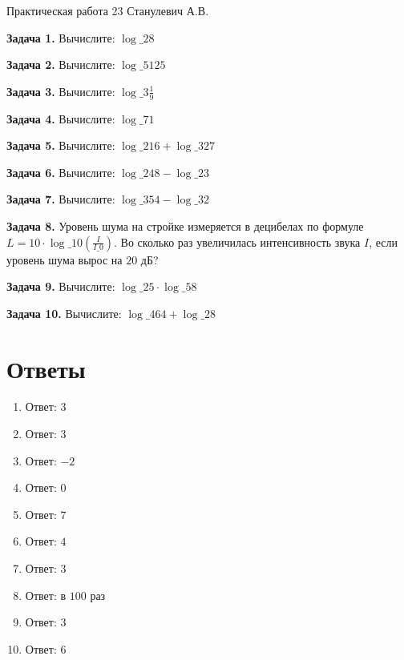 \documentclass{umk-matematika}
\begin{document}
\maketitlepage
    {Практическая работа 23}
    {}
    {Станулевич А.В.}

\textbf{Задача 1.} Вычислите: $\log\_{2} 8$\par\vspace{10pt}
\textbf{Задача 2.} Вычислите: $\log\_{5} 125$\par\vspace{10pt}
\textbf{Задача 3.} Вычислите: $\log\_{3} \frac{1}{9}$\par\vspace{10pt}
\textbf{Задача 4.} Вычислите: $\log\_{7} 1$\par\vspace{10pt}
\textbf{Задача 5.} Вычислите: $\log\_{2} 16 + \log\_{3} 27$\par\vspace{10pt}
\textbf{Задача 6.} Вычислите: $\log\_{2} 48 - \log\_{2} 3$\par\vspace{10pt}
\textbf{Задача 7.} Вычислите: $\log\_{3} 54 - \log\_{3} 2$\par\vspace{10pt}
\textbf{Задача 8.} Уровень шума на стройке измеряется в децибелах по формуле $L = 10 \cdot \log\_{10} \left(\frac{I}{I\_0}\right)$. Во сколько раз увеличилась интенсивность звука $I$, если уровень шума вырос на $20$ дБ?\par\vspace{10pt}
\textbf{Задача 9.} Вычислите: $\log\_{2} 5 \cdot \log\_{5} 8$\par\vspace{10pt}
\textbf{Задача 10.} Вычислите: $\log\_{4} 64 + \log\_{2} 8$\par\vspace{10pt}
\newpage
\section*{Ответы}

\begin{enumerate}
  \item Ответ: $3$
  \item Ответ: $3$
  \item Ответ: $-2$
  \item Ответ: $0$
  \item Ответ: $7$
  \item Ответ: $4$
  \item Ответ: $3$
  \item Ответ: в $100$ раз
  \item Ответ: $3$
  \item Ответ: $6$
\end{enumerate}
\end{document}
